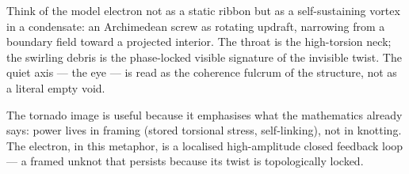 \documentclass[11pt,a4paper]{article}
\begin{document}
Think of the model electron not as a static ribbon but as a
self-sustaining vortex in a condensate: an Archimedean screw as rotating
updraft, narrowing from a boundary field toward a projected interior.
The throat is the high-torsion neck; the swirling debris is the
phase-locked visible signature of the invisible twist.  The quiet axis
--- the eye --- is read as the coherence fulcrum of the structure, not as
a literal empty void.

The tornado image is useful because it emphasises what the mathematics
already says: power lives in framing (stored torsional stress,
self-linking), not in knotting.  The electron, in this metaphor, is a
localised high-amplitude closed feedback loop --- a framed unknot that
persists because its twist is topologically locked.
\end{document}
